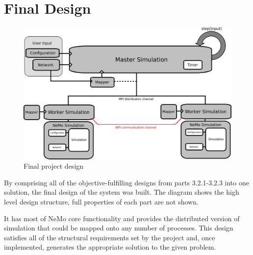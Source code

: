 \clearpage

\section{Final Design}

\begin{figure}[h]
\begin{center}
\includegraphics[scale = 0.45]{images/design/final_design.png}
\end{center}
\caption{Final project design}
\end{figure}

By comprising all of the objective-fulfilling designs from parts 3.2.1-3.2.3 into one solution, the final design of the system was built. The diagram shows the high level design structure, full properties of each part are not shown.

It has most of NeMo core functionality and provides the distributed version of simulation that could be mapped onto any number of processes. This design satisfies all of the structural requirements set by the project and, once implemented, generates the appropriate solution to the given problem.
